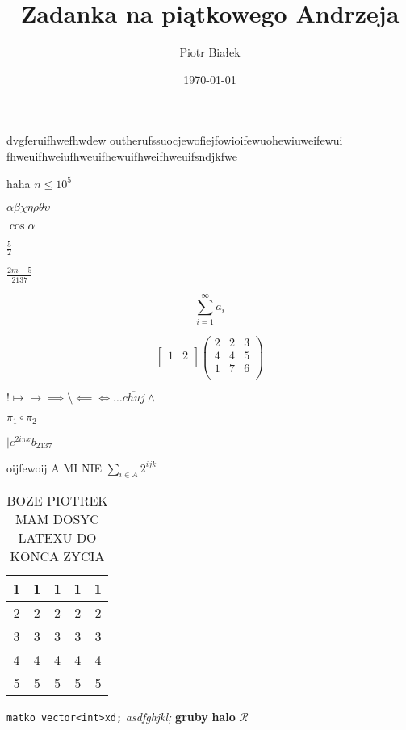 \documentclass{article}
\title{Zadanka na piątkowego Andrzeja}
\author{Piotr Białek}
\date{\today}
\begin{document}
\maketitle

dvgferuifhwefhwdew outherufssuocjewofiejfowioifewuohewiuweifewui
fhweuifhweiufhweuifhewuifhweifhweuifsndjkfwe 

haha \(n \leq 10^5 \) 

\(\alpha \beta \chi \eta \rho \theta \upsilon \) 

\(\cos \alpha  \) 

\(\frac{5}{2}\) 

\(\frac{2m+5}{2137}\) 

\[
    \sum_{i=1}^{\infty} a_i
\]

\[
    \begin{bmatrix}
        1 &  2 \\
    \end{bmatrix}
    \begin{pmatrix}
        2 & 2 & 3  \\
        4 & 4 & 5  \\
        1 & 7 &  6 \\
    \end{pmatrix}
\]

\( !\mapsto \to \implies \setminus \impliedby \iff 
    \ldots \overline{chuj} \wedge  \)

\(\pi_1 \circ \pi _2\)

\(\mid e^{2i \pi x} b_{2137}  \)

oijfewoij A MI NIE
\(\sum_{i\in A}^{} 2^{ijk} \) 


\begin{table}[H]
    \centering
    \begin{tabular}{c|c|c|c|c}
        \toprule
            1 & 1 & 1 & 1 & 1 \\
        \midrule
            2 & 2 & 2 & 2 & 2 \\
            3 & 3 & 3 & 3 & 3  \\
            4 & 4 & 4 & 4 & 4 \\
            5 & 5 & 5 & 5 & 5  \\
        \bottomrule
    \end{tabular}
    \caption{BOZE PIOTREK MAM DOSYC LATEXU DO KONCA ZYCIA}
    \label{tab:label}
\end{table}

\texttt{matko vector<int>xd;} 
\textit{asdfghjkl;} 
\textbf{gruby} 
\textbf{halo} 
\(\mathcal{{R}} \)  
\end{document}
